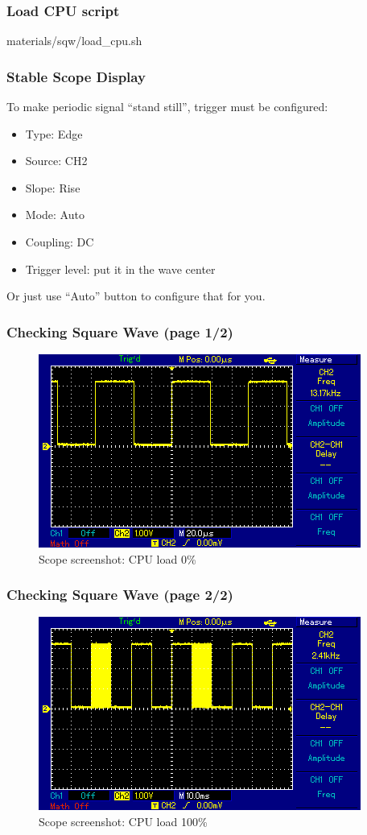 \begin{frame}[containsverbatim,allowframebreaks=1]
  \frametitle{Load CPU script}
  
    {materials/sqw/load_cpu.sh}
\end{frame}

\begin{frame}
  \frametitle{Stable Scope Display}
  To make periodic signal ``stand still'', trigger must be configured:
  \begin{itemize}
    \item Type: Edge
    \item Source: CH2
    \item Slope: Rise
    \item Mode: Auto
    \item Coupling: DC
    \item Trigger level: put it in the wave center
  \end{itemize}

  Or just use ``Auto'' button to configure that for you.
\end{frame}

\begin{frame}
  \frametitle{Checking Square Wave (page 1/2)}
  \begin{figure}
    \centering
    \includegraphics[scale=0.75]{images/scope-trace-sqw1.png}
    \caption{Scope screenshot: CPU load 0\%}
  \end{figure}
\end{frame}

\begin{frame}
  \frametitle{Checking Square Wave (page 2/2)}
  \begin{figure}
    \centering
    \includegraphics[scale=0.75]{images/scope-trace-sqw2.png}
    \caption{Scope screenshot: CPU load 100\%}
  \end{figure}
\end{frame}

